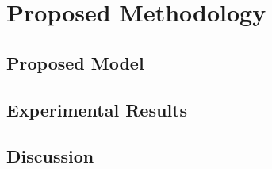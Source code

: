 \section{Proposed Methodology}

\subsection{Proposed Model}

\subsection{Experimental Results}

\subsection{Discussion}
